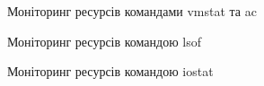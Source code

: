 \documentclass[a4paper,14pt]{extarticle}
\begin{document}
\begin{figure}[H]
    \caption{Моніторинг ресурсів командами vmstat та ac}
    \label{fig:vmstat & ac}
\end{figure}

\begin{figure}[H]
    \caption{Моніторинг ресурсів командою lsof}
    \label{fig:lsof}
\end{figure}

\begin{figure}[H]
    \caption{Моніторинг ресурсів командою iostat}
    \label{fig:iostat}
\end{figure}
\end{document}
